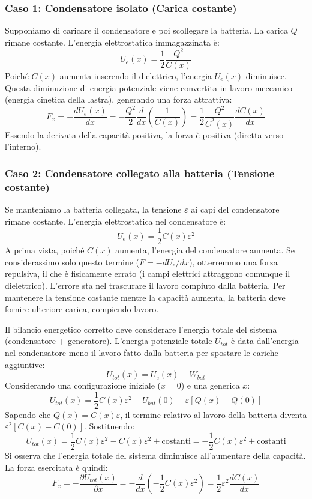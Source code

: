 \documentclass{book}
\begin{document}
\subsubsection*{Caso 1: Condensatore isolato (Carica costante)}
Supponiamo di caricare il condensatore e poi scollegare la batteria. La carica $Q$ rimane costante. L'energia elettrostatica immagazzinata è:
$$
U_e(x) = \frac{1}{2} \frac{Q^2}{C(x)}
$$
Poiché $C(x)$ aumenta inserendo il dielettrico, l'energia $U_e(x)$ diminuisce. Questa diminuzione di energia potenziale viene convertita in lavoro meccanico (energia cinetica della lastra), generando una forza attrattiva:
$$
F_x = - \frac{dU_e(x)}{dx} = - \frac{Q^2}{2} \frac{d}{dx}\left(\frac{1}{C(x)}\right) = \frac{1}{2}\frac{Q^2}{C^2(x)}\frac{dC(x)}{dx}
$$
Essendo la derivata della capacità positiva, la forza è positiva (diretta verso l'interno).

\subsubsection*{Caso 2: Condensatore collegato alla batteria (Tensione costante)}
Se manteniamo la batteria collegata, la tensione $\varepsilon$ ai capi del condensatore rimane costante. L'energia elettrostatica nel condensatore è:
$$
U_e(x)= \frac{1}{2}C(x) \varepsilon^2
$$
A prima vista, poiché $C(x)$ aumenta, l'energia del condensatore aumenta. Se considerassimo solo questo termine ($F = -dU_e/dx$), otterremmo una forza repulsiva, il che è fisicamente errato (i campi elettrici attraggono comunque il dielettrico).
L'errore sta nel trascurare il lavoro compiuto dalla batteria. Per mantenere la tensione costante mentre la capacità aumenta, la batteria deve fornire ulteriore carica, compiendo lavoro.

Il bilancio energetico corretto deve considerare l'energia totale del sistema (condensatore + generatore). L'energia potenziale totale $U_{tot}$ è data dall'energia nel condensatore meno il lavoro fatto dalla batteria per spostare le cariche aggiuntive:
$$
U_{tot}(x) = U_e(x) - W_{bat}
$$
Considerando una configurazione iniziale ($x=0$) e una generica $x$:
$$
U_{tot}(x) = \frac{1}{2}C(x)\varepsilon^2 + U_{bat}(0) - \varepsilon [Q(x) - Q(0)]
$$
Sapendo che $Q(x) = C(x)\varepsilon$, il termine relativo al lavoro della batteria diventa $\varepsilon^2 [C(x) - C(0)]$. Sostituendo:
$$
U_{tot}(x) = \frac{1}{2}C(x)\varepsilon^2 - C(x)\varepsilon^2 + \text{costanti} = -\frac{1}{2}C(x)\varepsilon^2 + \text{costanti}
$$
Si osserva che l'energia totale del sistema diminuisce all'aumentare della capacità. La forza esercitata è quindi:
$$
F_x = -\frac{\partial U_{tot}(x)}{\partial x} = -\frac{d}{dx}\left(-\frac{1}{2}C(x)\varepsilon^2\right) = \frac{1}{2}\varepsilon^2\frac{dC(x)}{dx}
$$
\end{document}
